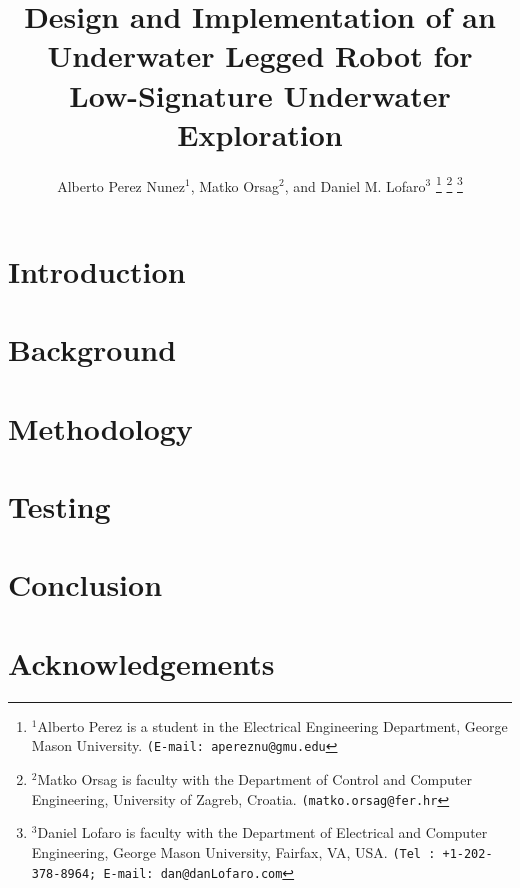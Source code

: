 \documentclass[letterpaper, 10 pt, conference]{ieeeconf}  %
\title{\LARGE \bf
Design and Implementation of an Underwater Legged Robot for Low-Signature Underwater Exploration%
}
\author{Alberto Perez Nunez$^{1}$, Matko Orsag$^{2}$, and Daniel M. Lofaro$^{3}$%
\thanks{$^{1}$Alberto Perez is a student in the Electrical Engineering Department, George Mason University.
{\tt\small (E-mail: apereznu@gmu.edu}}%
\thanks{$^{2}$Matko Orsag is faculty with the Department of Control and Computer Engineering, University of Zagreb, Croatia.
	{\tt\small (matko.orsag@fer.hr}}%
\thanks{$^{3}$Daniel Lofaro is faculty with the Department of Electrical and Computer Engineering, George Mason University, Fairfax, VA, USA.
	{\tt\small (Tel : +1-202-378-8964; E-mail: dan@danLofaro.com}}%
}
\begin{document}
\maketitle
\thispagestyle{empty}
\pagestyle{empty}


\begin{abstract}

\end{abstract}


\section{Introduction}



\section{Background}\label{sec:background}


\section{Methodology}


\section{Testing}


%

\section{Conclusion}


\section*{Acknowledgements}





\end{document}
